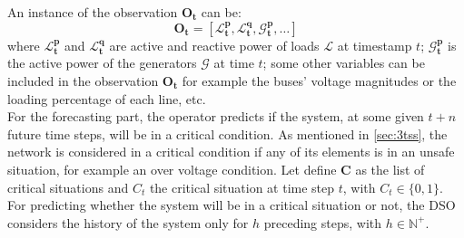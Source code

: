\noindent An instance of the observation $\mathbf{O_t}$ can be:
\begin{equation*}
    \mathbf{O_t} =  [
            \mathbf{\mathcal{L}^p_{t}}, 
            \mathbf{\mathcal{L}^q_{t}}, 
            \mathbf{\mathcal{G}^p_{t}},
            \dots ]
\end{equation*}
\noindent where $\mathbf{\mathcal{L}^p_{t}}$ and $\mathbf{\mathcal{L}^q_{t}}$ are active and reactive power of loads $\mathcal{L}$ at timestamp $t$; $\mathbf{\mathcal{G}^p_{t}}$ is the active power of the generators $\mathcal{G}$ at time $t$; some other variables can be included in the observation $\mathbf{O_t}$ for example the buses' voltage magnitudes or the loading percentage of each line, etc.\\

For the forecasting part, the operator predicts if the system, at some given $t+n$ future time steps, will be in a critical condition. As mentioned in \ref{sec:3tss}, the network is considered in a critical condition if any of its elements is in an unsafe situation, for example an over voltage condition. Let define $\textbf{C}$ as the list of critical situations and $C_t$ the critical situation at time step $t$, with $C_t \in \{0,1\}$.  \\
For predicting whether the system will be in a critical situation or not, the \gls{DSO} considers the history of the system only for $h$ preceding steps, with $h \in \mathbb{N}^+$. \\



